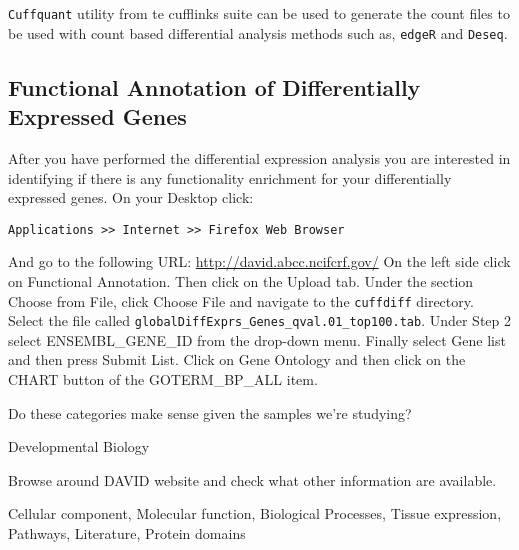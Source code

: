 \begin{information}
\texttt{Cuffquant} utility from te cufflinks suite can be used to generate the count files to be used with count based differential analysis methods such as, \texttt{edgeR} and \texttt{Deseq}.
\end{information}
\begin{bonus}
\section{Functional Annotation of Differentially Expressed Genes}
After you have performed the differential expression analysis you are interested
in identifying if there is any functionality enrichment for your differentially
expressed genes.
On your Desktop click:
\begin{lstlisting}[style=command_syntax]
Applications >> Internet >> Firefox Web Browser
\end{lstlisting}
And go to the following URL: \url{http://david.abcc.ncifcrf.gov/}
On the left side click on Functional Annotation. Then click on the Upload tab.
Under the section Choose from File, click Choose File and navigate to the
\texttt{cuffdiff} directory. Select the file called \texttt{globalDiffExprs\_Genes\_qval.01\_top100.tab}.
Under Step 2 select ENSEMBL\_GENE\_ID from the drop-down menu. Finally select
Gene list and then press Submit List.
Click on Gene Ontology and then click on the CHART button of the GOTERM\_BP\_ALL item.

\begin{questions}
Do these categories make sense given the samples we're studying?
\begin{answer}
Developmental Biology
\end{answer}

Browse around DAVID website and check what other information are available.
\begin{answer}
Cellular component, Molecular function, Biological Processes, Tissue expression, Pathways, Literature, Protein domains 
\end{answer}
\end{questions}
\end{bonus}

\newpage

